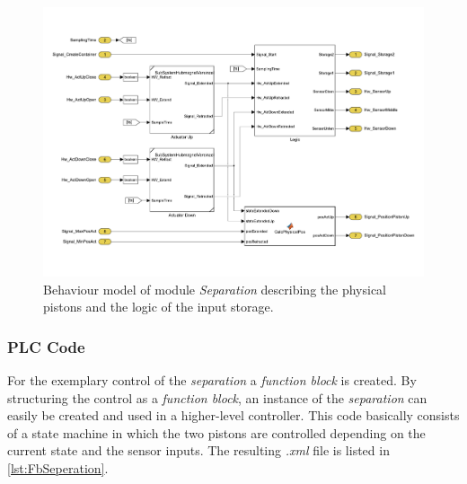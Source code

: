 	\begin{figure}[htp]
		\centering
		\includegraphics[trim=0mm 20mm 0mm 20mm, clip, width=0.95\linewidth]{figures/BehaviourModelSeperation.pdf}
		\caption[Behaviour model of module \textit{Separation}.]{Behaviour model of module \textit{Separation} describing the physical pistons and the logic of the input storage.}
		\label{fig:ModuleSeperationBehaviourModel}
	\end{figure}
	

    
\subsubsection{PLC Code}
    For the exemplary control of the \textit{separation} a \textit{function block} is created. By structuring the control as a \textit{function block}, an instance of the \textit{separation} can easily be created and used in a higher-level controller. This code basically consists of a state machine in which the two pistons are controlled depending on the current state and the sensor inputs. The resulting \textit{.xml} file is listed in \autoref{lst:FbSeperation}. 

